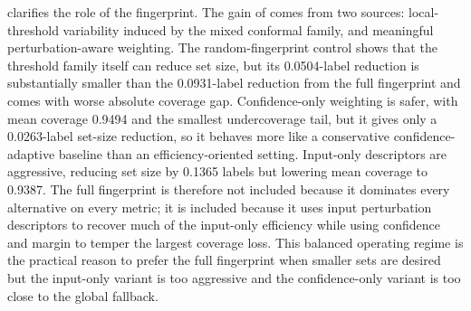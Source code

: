  clarifies the role of the fingerprint. The gain of \fastcp{} comes from two sources: local-threshold variability induced by the mixed conformal family, and meaningful perturbation-aware weighting. The random-fingerprint control shows that the threshold family itself can reduce set size, but its 0.0504-label reduction is substantially smaller than the 0.0931-label reduction from the full fingerprint and comes with worse absolute coverage gap. Confidence-only weighting is safer, with mean coverage 0.9494 and the smallest undercoverage tail, but it gives only a 0.0263-label set-size reduction, so it behaves more like a conservative confidence-adaptive baseline than an efficiency-oriented setting. Input-only descriptors are aggressive, reducing set size by 0.1365 labels but lowering mean coverage to 0.9387. The full fingerprint is therefore not included because it dominates every alternative on every metric; it is included because it uses input perturbation descriptors to recover much of the input-only efficiency while using confidence and margin to temper the largest coverage loss. This balanced operating regime is the practical reason to prefer the full fingerprint when smaller sets are desired but the input-only variant is too aggressive and the confidence-only variant is too close to the global fallback.
